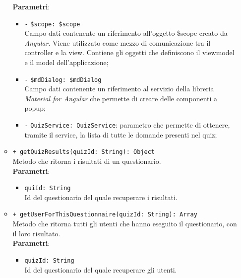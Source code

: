 \begin{itemize}
\begin{itemize}
		\textbf{Parametri}: 
		\begin{itemize}
			\item \texttt{-} \texttt{\$scope: \$scope} \\
			Campo dati contenente un riferimento all’oggetto \$scope creato da \textit{Angular}. Viene utilizzato come mezzo di comunicazione tra il controller e la view. Contiene gli oggetti che definiscono il viewmodel e il model dell’applicazione;
			\item \texttt{-} \texttt{\$mdDialog: \$mdDialog} \\
			Campo dati contenente un riferimento al servizio della libreria \textit{Material for Angular} che permette di creare delle componenti a popup;
			\item \texttt{-} \texttt{QuizService: QuizService}: parametro che permette di ottenere, tramite il service, la lista di tutte le domande presenti nel quiz;
		\end{itemize}
		\item \texttt{+ getQuizResults(quizId: String): Object} \\ Metodo che ritorna i risultati di un questionario. \\
		\textbf{Parametri}:
		\begin{itemize}
			\item \texttt{quiId: String} \\ Id del questionario del quale recuperare i risultati.
		\end{itemize}
		\item \texttt{+ getUserForThisQuestionnaire(quizId: String): Array} \\ Metodo che ritorna tutti gli utenti che hanno eseguito il questionario, con il loro risultato. \\
		\textbf{Parametri}:
		\begin{itemize}
			\item \texttt{quizId: String} \\ Id del questionario del quale recuperare gli utenti.
		\end{itemize}
	\end{itemize}
\end{itemize}

